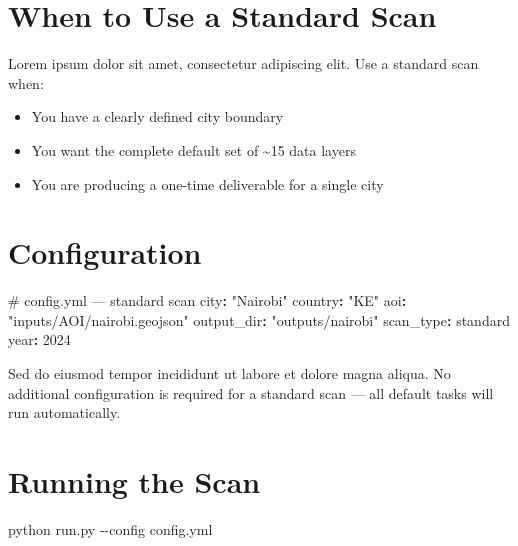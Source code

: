 \documentclass[
  letterpaper,
  DIV=11,
  numbers=noendperiod]{scrreprt}
\newenvironment{Shaded}{\begin{snugshade}}{\end{snugshade}}
\newcommand{\AttributeTok}[1]{\textcolor[rgb]{0.40,0.45,0.13}{#1}}
\newcommand{\CommentTok}[1]{\textcolor[rgb]{0.37,0.37,0.37}{#1}}
\newcommand{\DecValTok}[1]{\textcolor[rgb]{0.68,0.00,0.00}{#1}}
\newcommand{\ExtensionTok}[1]{\textcolor[rgb]{0.00,0.23,0.31}{#1}}
\newcommand{\FunctionTok}[1]{\textcolor[rgb]{0.28,0.35,0.67}{#1}}
\newcommand{\KeywordTok}[1]{\textcolor[rgb]{0.00,0.23,0.31}{\textbf{#1}}}
\newcommand{\NormalTok}[1]{\textcolor[rgb]{0.00,0.23,0.31}{#1}}
\newcommand{\StringTok}[1]{\textcolor[rgb]{0.13,0.47,0.30}{#1}}
\providecommand{\tightlist}{%
  \setlength{\itemsep}{0pt}\setlength{\parskip}{0pt}}
\begin{document}
\section{When to Use a Standard Scan}\label{when-to-use-a-standard-scan}

Lorem ipsum dolor sit amet, consectetur adipiscing elit. Use a standard
scan when:

\begin{itemize}
\tightlist
\item
  You have a clearly defined city boundary
\item
  You want the complete default set of \textasciitilde15 data layers
\item
  You are producing a one-time deliverable for a single city
\end{itemize}

\section{Configuration}\label{configuration}

\begin{Shaded}
\begin{Highlighting}[]
\CommentTok{\# config.yml — standard scan}
\FunctionTok{city}\KeywordTok{:}\AttributeTok{ }\StringTok{"Nairobi"}
\FunctionTok{country}\KeywordTok{:}\AttributeTok{ }\StringTok{"KE"}
\FunctionTok{aoi}\KeywordTok{:}\AttributeTok{ }\StringTok{"inputs/AOI/nairobi.geojson"}
\FunctionTok{output\_dir}\KeywordTok{:}\AttributeTok{ }\StringTok{"outputs/nairobi"}
\FunctionTok{scan\_type}\KeywordTok{:}\AttributeTok{ standard}
\FunctionTok{year}\KeywordTok{:}\AttributeTok{ }\DecValTok{2024}
\end{Highlighting}
\end{Shaded}

Sed do eiusmod tempor incididunt ut labore et dolore magna aliqua. No
additional configuration is required for a standard scan --- all default
tasks will run automatically.

\section{Running the Scan}\label{running-the-scan}

\begin{Shaded}
\begin{Highlighting}[]
\ExtensionTok{python}\NormalTok{ run.py }\AttributeTok{{-}{-}config}\NormalTok{ config.yml}
\end{Highlighting}
\end{Shaded}
\end{document}
